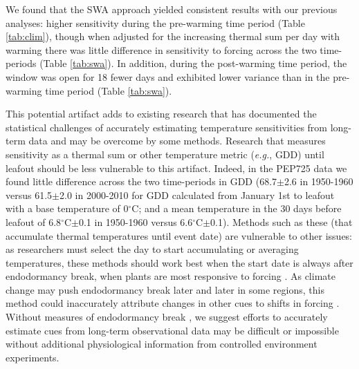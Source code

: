 \documentclass{article}
\begin{document}
\par We found that the SWA approach yielded consistent results with our previous analyses: higher sensitivity during the pre-warming time period (Table \ref{tab:clim}), though when adjusted for the increasing thermal sum per day with warming there was little difference in sensitivity to forcing across the two time-periods (Table \ref{tab:swa}). In addition, during the post-warming time period, the window was open for 18 fewer days and exhibited lower variance than in the pre-warming time period (Table \ref{tab:swa}). 

\par This potential artifact adds to existing research that has documented the statistical challenges of accurately estimating temperature sensitivities from long-term data \emph{\citep{gusewell2017,clark2014a}} and may be overcome by some methods. Research that measures sensitivity as a thermal sum or other temperature metric (\emph{e.g.}, GDD) until leafout should be less vulnerable to this artifact. Indeed, in the PEP725 data we found little difference across the two time-periods in GDD (68.7$\pm$2.6 in 1950-1960 versus 61.5$\pm$2.0 in 2000-2010 for GDD calculated from January 1st to leafout with a base temperature of 0$^{\circ}$C; and a mean temperature in the 30 days before leafout of 6.8$^{\circ}$C$\pm$0.1 in 1950-1960 versus 6.6$^{\circ}$C$\pm$0.1). Methods such as these (that accumulate thermal temperatures until event date) are vulnerable to other issues: as researchers must select the day to start accumulating or averaging temperatures, these methods should work best when the start date is always after endodormancy break, when plants are most responsive to forcing \emph{\citep{chuine2016}}. As climate change may push endodormancy break later and later in some regions, this method could inaccurately attribute changes in other cues to shifts in forcing \emph{\citep{gusewell2017}}. Without measures of endodormancy break \emph{\citep{chuine2016}}, we suggest efforts to accurately estimate cues from long-term observational data may be difficult or impossible without additional physiological information from controlled environment experiments.


%
\end{document}
